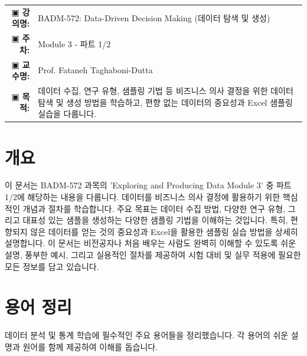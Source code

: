 \documentclass[11pt,a4paper]{article}
\makeatletter
\theoremstyle{definition}
\newcommand{\metainfo}[4]{
\begin{tcolorbox}[
    colback=lightpurple,
    colframe=darkpurple,
    boxrule=1pt,
    arc=2mm,
    left=10pt,
    right=10pt,
    top=8pt,
    bottom=8pt
]
\begin{tabular}{@{}rl@{}}
▣ \textbf{강의명:} & #1 \\[0.3em]
▣ \textbf{주차:} & #2 \\[0.3em]
▣ \textbf{교수명:} & #3 \\[0.3em]
▣ \textbf{목적:} & \begin{minipage}[t]{0.75\textwidth}#4\end{minipage}
\end{tabular}
\end{tcolorbox}
}
\makeatother
\begin{document}
\thispagestyle{firstpage}

\metainfo{BADM-572: Data-Driven Decision Making (데이터 탐색 및 생성)}{Module 3 - 파트 1/2}{Prof. Fataneh Taghaboni-Dutta}{데이터 수집, 연구 유형, 샘플링 기법 등 비즈니스 의사 결정을 위한 데이터 탐색 및 생성 방법을 학습하고, 편향 없는 데이터의 중요성과 Excel 샘플링 실습을 다룹니다.}

\tableofcontents

\newpage

\section{개요}

이 문서는 BADM-572 과목의 'Exploring and Producing Data Module 3' 중 파트 1/2에 해당하는 내용을 다룹니다.
데이터를 비즈니스 의사 결정에 활용하기 위한 핵심적인 개념과 절차를 학습합니다.
주요 목표는 데이터 수집 방법, 다양한 연구 유형, 그리고 대표성 있는 샘플을 생성하는 다양한 샘플링 기법을 이해하는 것입니다.
특히, 편향되지 않은 데이터를 얻는 것의 중요성과 Excel을 활용한 샘플링 실습 방법을 상세히 설명합니다.
이 문서는 비전공자나 처음 배우는 사람도 완벽히 이해할 수 있도록 쉬운 설명, 풍부한 예시, 그리고 실용적인 절차를 제공하여 시험 대비 및 실무 적용에 필요한 모든 정보를 담고 있습니다.

\newpage
\section{용어 정리}

데이터 분석 및 통계 학습에 필수적인 주요 용어들을 정리했습니다. 각 용어의 쉬운 설명과 원어를 함께 제공하여 이해를 돕습니다.
\end{document}
